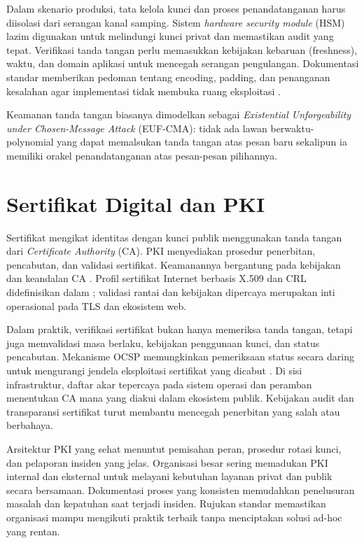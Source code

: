 \documentclass[../main.tex]{subfiles}
\begin{document}
Dalam skenario produksi, tata kelola kunci dan proses penandatanganan harus diisolasi dari serangan kanal samping. Sistem \emph{hardware security module} (HSM) lazim digunakan untuk melindungi kunci privat dan memastikan audit yang tepat. Verifikasi tanda tangan perlu memasukkan kebijakan kebaruan (freshness), waktu, dan domain aplikasi untuk mencegah serangan pengulangan. Dokumentasi standar memberikan pedoman tentang encoding, padding, dan penanganan kesalahan agar implementasi tidak membuka ruang eksploitasi \citep{rfc8017,rfc8032}.

\begin{definition}
Keamanan tanda tangan biasanya dimodelkan sebagai \emph{Existential Unforgeability under Chosen-Message Attack} (EUF-CMA): tidak ada lawan berwaktu-polynomial yang dapat memalsukan tanda tangan atas pesan baru sekalipun ia memiliki orakel penandatanganan atas pesan-pesan pilihannya.
\end{definition}

\section{Sertifikat Digital dan PKI}
Sertifikat mengikat identitas dengan kunci publik menggunakan tanda tangan dari \emph{Certificate Authority} (CA). PKI menyediakan prosedur penerbitan, pencabutan, dan validasi sertifikat. Keamanannya bergantung pada kebijakan dan keandalan CA \citep{stallings}. Profil sertifikat Internet berbasis X.509 dan CRL didefinisikan dalam \citep{rfc5280}; validasi rantai dan kebijakan dipercaya merupakan inti operasional pada TLS dan ekosistem web.

Dalam praktik, verifikasi sertifikat bukan hanya memeriksa tanda tangan, tetapi juga memvalidasi masa berlaku, kebijakan penggunaan kunci, dan status pencabutan. Mekanisme OCSP memungkinkan pemeriksaan status secara daring untuk mengurangi jendela eksploitasi sertifikat yang dicabut \citep{rfc6960}. Di sisi infrastruktur, daftar akar tepercaya pada sistem operasi dan peramban menentukan CA mana yang diakui dalam ekosistem publik. Kebijakan audit dan transparansi sertifikat turut membantu mencegah penerbitan yang salah atau berbahaya.

Arsitektur PKI yang sehat menuntut pemisahan peran, prosedur rotasi kunci, dan pelaporan insiden yang jelas. Organisasi besar sering memadukan PKI internal dan eksternal untuk melayani kebutuhan layanan privat dan publik secara bersamaan. Dokumentasi proses yang konsisten memudahkan penelusuran masalah dan kepatuhan saat terjadi insiden. Rujukan standar memastikan organisasi mampu mengikuti praktik terbaik tanpa menciptakan solusi ad-hoc yang rentan.
\end{document}
